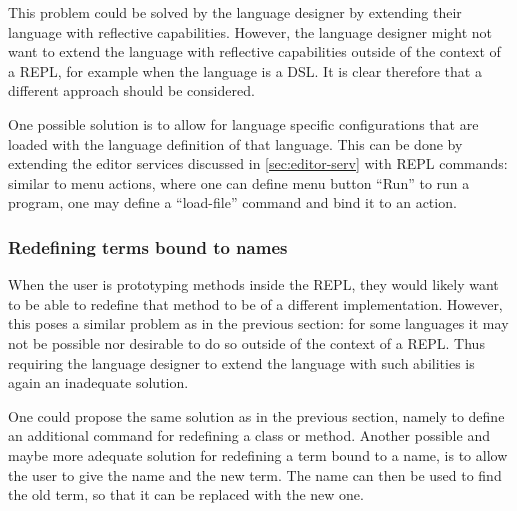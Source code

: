 This problem could be solved by the language designer by extending
their language with reflective capabilities. However, the language
designer might not want to extend the language with reflective
capabilities outside of the context of a REPL, for example when the
language is a DSL. It is clear therefore that a different approach
should be considered.

One possible solution is to allow for language specific configurations
that are loaded with the language definition of that language. This
can be done by extending the editor services discussed in
\cref{sec:editor-serv} with REPL commands: similar to menu actions,
where one can define menu button ``Run'' to run a program, one may
define a ``load-file'' command and bind it to an action.

\subsubsection{Redefining terms bound to names}
\label{sec:redef-cont-bound}
When the user is prototyping methods inside the REPL, they would
likely want to be able to redefine that method to be of a different
implementation. However, this poses a similar problem as in the
previous section: for some languages it may not be possible nor
desirable to do so outside of the context of a REPL. Thus requiring
the language designer to extend the language with such abilities is
again an inadequate solution.

One could propose the same solution as in the previous section, namely to
define an additional command for redefining a class or method. Another possible
and maybe more adequate solution for redefining a term bound to a name, is to
allow the user to give the name and the new term. The name can then be used to
find the old term, so that it can be replaced with the new one.

